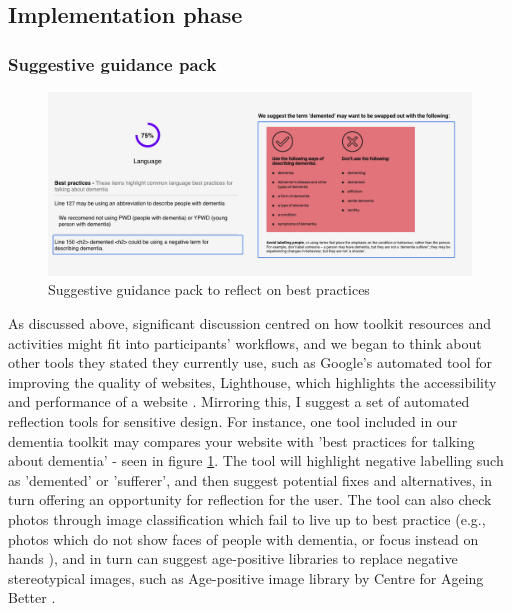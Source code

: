 \subsection{Implementation phase}
\subsubsection{Suggestive guidance pack}
\begin{figure}[h]
\centering
\includegraphics[width=1\linewidth]{Images/D3Toolkit/Fig10.png}
\caption{Suggestive guidance pack to reflect on best practices}
\label{fig:suggestPack}
\end{figure}
As discussed above, significant discussion centred on how toolkit resources and activities might fit into participants’ workflows, and we began to think about other tools they stated they currently use, such as Google’s automated tool for improving the quality of websites, Lighthouse, which highlights the accessibility and performance of a website \citep{chrome_lighthouse_2021}. Mirroring this, I suggest a set of automated reflection tools for sensitive design. For instance, one tool included in our dementia toolkit may compares your website with 'best practices for talking about dementia' - seen in figure \ref{fig:suggestPack}. The tool will highlight negative labelling such as 'demented' or 'sufferer', and then suggest potential fixes and alternatives, in turn offering an opportunity for reflection for the user. The tool can also check photos through image classification which fail to live up to best practice (e.g., photos which do not show faces of people with dementia, or focus instead on hands \citep{low2020negative}), and in turn can suggest age-positive libraries to replace negative stereotypical images, such as Age-positive image library by Centre for Ageing Better \citep{noauthor_age-positive_nodate}.

